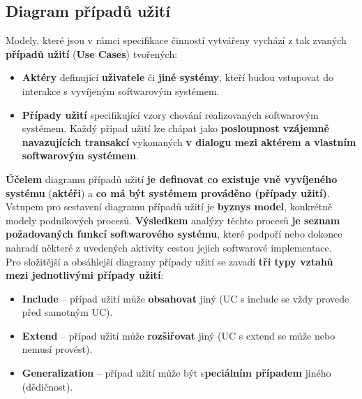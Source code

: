 \subsection{Diagram případů užití}
Modely, které jsou v rámci specifikace činností vytvářeny vychází z tak zvaných \textbf{případů užití} (\textbf{Use Cases}) tvořených: 
\begin{itemize}
\item \textbf{Aktéry} definující \textbf{uživatele} či \textbf{jiné systémy}, kteří budou vstupovat do interakce s vyvíjeným softwarovým systémem.
\item \textbf{Případy užití} specifikující vzory chování realizovaných softwarovým systémem.  Každý případ užití lze chápat jako \textbf{posloupnost vzájemně navazujících transakcí} vykonaných \textbf{v dialogu mezi aktérem a vlastním softwarovým systémem}.
\end{itemize}
\textbf{Účelem} diagramu případů užití \textbf{je definovat co existuje vně vyvíjeného systému} (\textbf{aktéři}) a \textbf{co má být systémem prováděno (případy užití)}. Vstupem pro sestavení diagramu případů užití je \textbf{byznys model}, konkrétně modely podnikových procesů.  \textbf{Výsledkem} analýzy těchto procesů \textbf{je seznam požadovaných funkcí softwarového systému}, které podpoří nebo dokonce nahradí některé z uvedených aktivity cestou jejich softwarové implementace. \\
\noindent{}
Pro složitější a obsáhlejší diagramy případy užití se zavadí \textbf{tři typy vztahů mezi jednotlivými případy užití}:
\begin{itemize}
\item \textbf{Include} – případ užití může \textbf{obsahovat} jiný (UC s include se vždy provede před samotným UC).
\item \textbf{Extend} – případ užití může \textbf{rozšiřovat} jiný (UC s extend se může nebo nemusí provést).
\item \textbf{Generalization} – případ užití může být s\textbf{peciálním případem }jiného (dědičnost).
\end{itemize}


